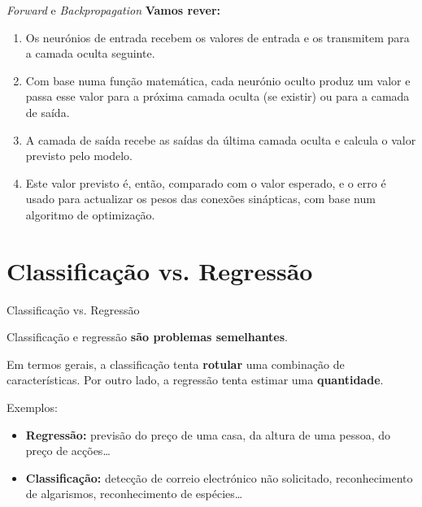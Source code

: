\begin{frame}{\textit{Forward} e \textit{Backpropagation}}
    \textbf{Vamos rever:}
    
    \medskip
    
    \begin{enumerate}
        \item  Os neurónios de entrada recebem os valores de entrada e os transmitem para a camada oculta seguinte.
        \pauseskip
        \item Com base numa função matemática, cada neurónio oculto produz um valor e passa esse valor para a próxima camada oculta (se existir) ou para a camada de saída.
        \pauseskip
        \item A camada de saída recebe as saídas da última camada oculta e calcula o valor previsto pelo modelo.
        \pauseskip
        \item Este valor previsto é, então, comparado com o valor esperado, e o erro é usado para actualizar os pesos das conexões sinápticas, com base num algoritmo de optimização.
    \end{enumerate}
    
\end{frame}

\section{Classificação vs. Regressão}

\begin{frame}{Classificação vs. Regressão}

Classificação e regressão \textbf{são problemas semelhantes}.

\medskip

Em termos gerais, a classificação tenta \textbf{rotular} uma combinação de características. Por outro lado, a regressão tenta estimar uma \textbf{quantidade}.

\pauseskip

Exemplos:
\begin{itemize}
    \item \textbf{Regressão:} previsão do preço de uma casa, da altura de uma pessoa, do preço de acções\ldots
    \item \textbf{Classificação:} detecção de correio electrónico não solicitado, reconhecimento de algarismos, reconhecimento de espécies\ldots
\end{itemize}

\end{frame}

